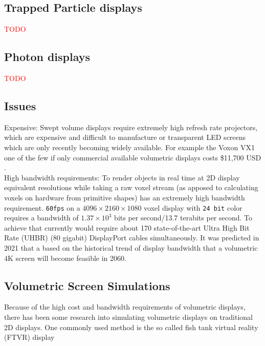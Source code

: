 \subsection{Trapped Particle displays}
{\textcolor{red}{TODO}}

\subsection{Photon displays}
{\textcolor{red}{TODO}}

\subsection{Issues}

Expensive: Swept volume displays require extremely high refresh rate projectors, which are expensive and difficult to manufacture or transparent LED screens which are only recently becoming widely available. For example the Voxon VX1 one of the few if only commercial available volumetric displays costs \$11,700 USD \cite{noauthor_products_nodate}. \\

High bandwidth requirements: To render objects in real time at 2D display equivalent resolutions while taking a raw voxel stream (as apposed to calculating voxels on hardware from primitive shapes) has an extremely high bandwidth requirement. \texttt{60fps} on a $4096 \times 2160 \times 1080$ voxel display with \texttt{24 bit} color requires a bandwidth of $1.37 \times 10^3$ bits per second/13.7 terabits per second. To achieve that currently would require about 170 state-of-the-art Ultra High Bit Rate (UHBR) (80 gigabit) DisplayPort cables simultaneously. It was predicted in 2021 \cite{LAM2021050011} that a based on the historical trend of display bandwidth that a volumetric 4K screen will become feasible in 2060.

\subsection{Volumetric Screen Simulations}
Because of the high cost and bandwidth requirements of volumetric displays, there has been some research into simulating volumetric displays on traditional 2D displays. One commonly used method is the so called fish tank virtual reality (FTVR) display \cite{10.1145/3290605.3300763} \cite{Zabarauskas2012}